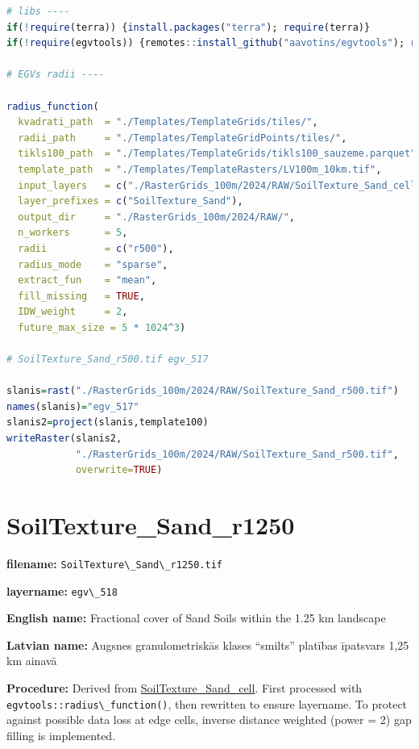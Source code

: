 \documentclass[
]{book}
\newcommand{\passthrough}[1]{#1}
\begin{document}
\begin{lstlisting}[language=R]
# libs ----
if(!require(terra)) {install.packages("terra"); require(terra)}
if(!require(egvtools)) {remotes::install_github("aavotins/egvtools"); require(egvtools)}

# EGVs radii ----

radius_function(
  kvadrati_path  = "./Templates/TemplateGrids/tiles/",
  radii_path     = "./Templates/TemplateGridPoints/tiles/",
  tikls100_path  = "./Templates/TemplateGrids/tikls100_sauzeme.parquet",
  template_path  = "./Templates/TemplateRasters/LV100m_10km.tif",
  input_layers   = c("./RasterGrids_100m/2024/RAW/SoilTexture_Sand_cell.tif"),
  layer_prefixes = c("SoilTexture_Sand"),
  output_dir     = "./RasterGrids_100m/2024/RAW/",
  n_workers      = 5,
  radii          = c("r500"),
  radius_mode    = "sparse",
  extract_fun    = "mean",
  fill_missing   = TRUE,
  IDW_weight     = 2,
  future_max_size = 5 * 1024^3)

# SoilTexture_Sand_r500.tif egv_517

slanis=rast("./RasterGrids_100m/2024/RAW/SoilTexture_Sand_r500.tif")
names(slanis)="egv_517"
slanis2=project(slanis,template100)
writeRaster(slanis2,
            "./RasterGrids_100m/2024/RAW/SoilTexture_Sand_r500.tif",
            overwrite=TRUE)
\end{lstlisting}

\section{SoilTexture\_Sand\_r1250}\label{ch06.518}

\textbf{filename:} \passthrough{\lstinline!SoilTexture\_Sand\_r1250.tif!}

\textbf{layername:} \passthrough{\lstinline!egv\_518!}

\textbf{English name:} Fractional cover of Sand Soils within the 1.25 km landscape

\textbf{Latvian name:} Augsnes granulometriskās klases ``smilts'' platības īpatsvars 1,25 km ainavā

\textbf{Procedure:} Derived from \hyperref[ch06.516]{SoilTexture\_Sand\_cell}. First processed
with \passthrough{\lstinline!egvtools::radius\_function()!}, then rewritten to ensure layername. To protect against
possible data loss at edge cells, inverse distance weighted (power = 2) gap filling
is implemented.
\end{document}
